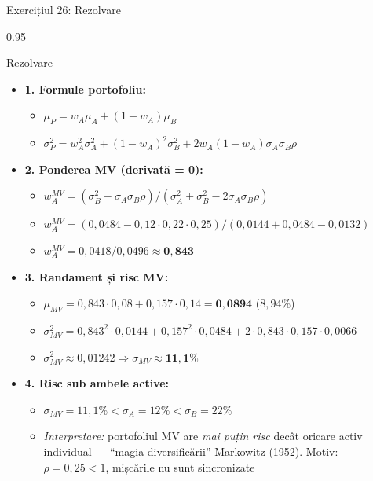 \documentclass[9pt, aspectratio=169, t]{beamer}
\begin{document}
\begin{frame}[shrink=30]{Exercițiul 26: Rezolvare}
\begin{cminipage}{0.95\textwidth}
\begin{exampleblock}{Rezolvare}
\begin{itemize}\setlength{\itemsep}{0pt}
    \item \textbf{1. Formule portofoliu:}
    \begin{itemize}\setlength{\itemsep}{0pt}
        \item $\mu_P = w_A \mu_A + (1 - w_A) \mu_B$
        \item $\sigma_P^2 = w_A^2 \sigma_A^2 + (1 - w_A)^2 \sigma_B^2 + 2 w_A(1 - w_A) \sigma_A \sigma_B \rho$
    \end{itemize}
    \item \textbf{2. Ponderea MV (derivată = 0):}
    \begin{itemize}\setlength{\itemsep}{0pt}
        \item $w_A^{MV} = (\sigma_B^2 - \sigma_A \sigma_B \rho) / (\sigma_A^2 + \sigma_B^2 - 2 \sigma_A \sigma_B \rho)$
        \item $w_A^{MV} = (0{,}0484 - 0{,}12 \cdot 0{,}22 \cdot 0{,}25) / (0{,}0144 + 0{,}0484 - 0{,}0132)$
        \item $w_A^{MV} = 0{,}0418 / 0{,}0496 \approx \mathbf{0{,}843}$
    \end{itemize}
    \item \textbf{3. Randament și risc MV:}
    \begin{itemize}\setlength{\itemsep}{0pt}
        \item $\mu_{MV} = 0{,}843 \cdot 0{,}08 + 0{,}157 \cdot 0{,}14 = \mathbf{0{,}0894}$ ($8{,}94\%$)
        \item $\sigma_{MV}^2 = 0{,}843^2 \cdot 0{,}0144 + 0{,}157^2 \cdot 0{,}0484 + 2 \cdot 0{,}843 \cdot 0{,}157 \cdot 0{,}0066$
        \item $\sigma_{MV}^2 \approx 0{,}01242 \Rightarrow \sigma_{MV} \approx \mathbf{11{,}1\%}$
    \end{itemize}
    \item \textbf{4. Risc sub ambele active:}
    \begin{itemize}\setlength{\itemsep}{0pt}
        \item $\sigma_{MV} = 11{,}1\% < \sigma_A = 12\% < \sigma_B = 22\%$
        \item \textit{Interpretare:} portofoliul MV are \emph{mai puțin risc} decât oricare activ individual --- ``magia diversificării'' Markowitz (1952). Motiv: $\rho = 0{,}25 < 1$, mișcările nu sunt sincronizate

\end{itemize}
\end{itemize}
\end{exampleblock}
\end{cminipage}
\end{frame}
\end{document}
